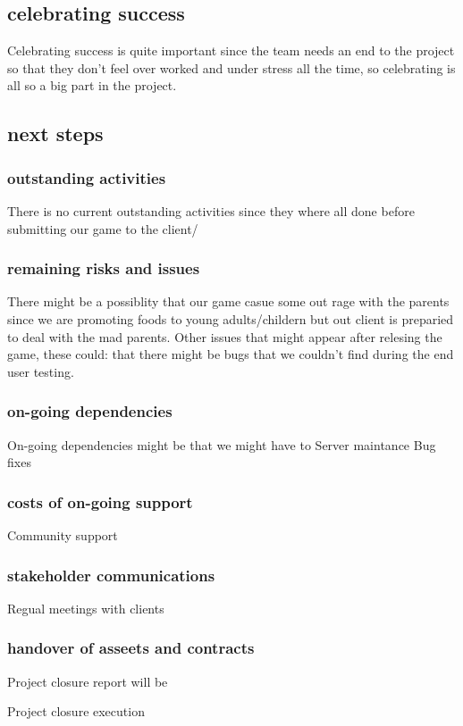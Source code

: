 \documentclass{article}
\begin{document}
\subsection{celebrating success}
Celebrating success is quite important since the team needs an end to the project so that they don't feel over worked and under stress all the time, so celebrating is all so a big part in the project.


\subsection{next steps}
\subsubsection{outstanding activities}
There is no current outstanding activities since they where all done before submitting our game to the client/

\subsubsection{remaining risks and issues}
There might be a possiblity that our game casue some out rage with the parents since we are promoting foods to young adults/childern but out client is preparied to deal with the mad parents. Other issues that might appear after relesing the game, these could: that there might be bugs that we couldn't find during the end user testing. 

\subsubsection{on-going dependencies}
On-going dependencies might be that we might have to 
Server maintance 
Bug fixes


\subsubsection{costs of on-going support}
Community support

\subsubsection{stakeholder communications}
Regual meetings with clients

\subsubsection{handover of asseets  and contracts}




Project closure report will be

Project closure execution 
\end{document}
